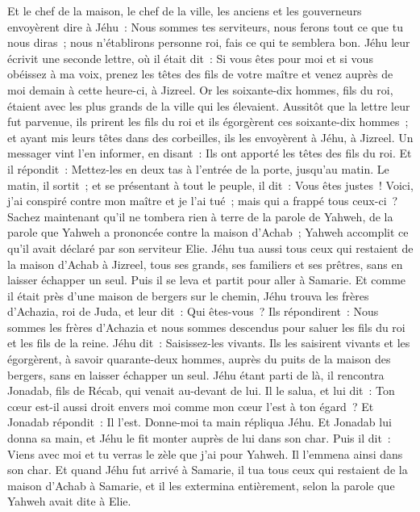 \begin{multicols}{2}
Et le chef de la maison, le chef de la ville, les anciens et les gouverneurs envoyèrent dire à Jéhu~: Nous sommes tes serviteurs, nous ferons tout ce que tu nous diras~; nous n'établirons personne roi, fais ce qui te semblera bon.
Jéhu leur écrivit une seconde lettre, où il était dit~: Si vous êtes pour moi et si vous obéissez à ma voix, prenez les têtes des fils de votre maître et venez auprès de moi demain à cette heure-ci, à Jizreel. Or les soixante-dix hommes, fils du roi, étaient avec les plus grands de la ville qui les élevaient.
Aussitôt que la lettre leur fut parvenue, ils prirent les fils du roi et ils égorgèrent ces soixante-dix hommes~; et ayant mis leurs têtes dans des corbeilles, ils les envoyèrent à Jéhu, à Jizreel.
Un messager vint l'en informer, en disant~: Ils ont apporté les têtes des fils du roi. Et il répondit~: Mettez-les en deux tas à l'entrée de la porte, jusqu'au matin.
Le matin, il sortit~; et se présentant à tout le peuple, il dit~: Vous êtes justes~! Voici, j'ai conspiré contre mon maître et je l'ai tué~; mais qui a frappé tous ceux-ci~?
Sachez maintenant qu'il ne tombera rien à terre de la parole de Yahweh, de la parole que Yahweh a prononcée contre la maison d'Achab~; Yahweh accomplit ce qu'il avait déclaré par son serviteur Elie.
Jéhu tua aussi tous ceux qui restaient de la maison d'Achab à Jizreel, tous ses grands, ses familiers et ses prêtres, sans en laisser échapper un seul.
Puis il se leva et partit pour aller à Samarie. Et comme il était près d'une maison de bergers sur le chemin,
Jéhu trouva les frères d'Achazia, roi de Juda, et leur dit~: Qui êtes-vous~? Ils répondirent~: Nous sommes les frères d'Achazia et nous sommes descendus pour saluer les fils du roi et les fils de la reine.
Jéhu dit~: Saisissez-les vivants. Ils les saisirent vivants et les égorgèrent, à savoir quarante-deux hommes, auprès du puits de la maison des bergers, sans en laisser échapper un seul.
Jéhu étant parti de là, il rencontra Jonadab, fils de Récab, qui venait au-devant de lui. Il le salua, et lui dit~: Ton cœur est-il aussi droit envers moi comme mon cœur l'est à ton égard~? Et Jonadab répondit~: Il l'est. Donne-moi ta main répliqua Jéhu. Et Jonadab lui donna sa main, et Jéhu le fit monter auprès de lui dans son char.
Puis il dit~: Viens avec moi et tu verras le zèle que j'ai pour Yahweh. Il l'emmena ainsi dans son char.
Et quand Jéhu fut arrivé à Samarie, il tua tous ceux qui restaient de la maison d'Achab à Samarie, et il les extermina entièrement, selon la parole que Yahweh avait dite à Elie.

\end{multicols}
